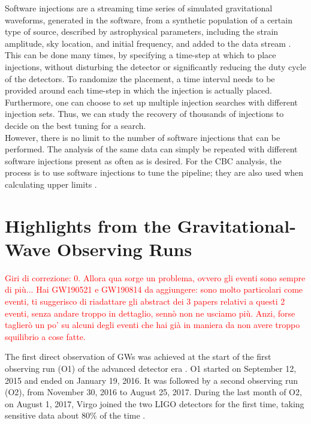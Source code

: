 \documentclass[binding=0.6cm, LaM]{sapthesis}
\newcommand{\fpg}[1]{\textcolor{red}{#1} }
\begin{document}
	Software injections are a streaming time series of simulated gravitational waveforms, 
	generated in the software, from a synthetic population of a certain type of source, 
	described by astrophysical parameters, including the strain amplitude, sky location, 	
	and initial frequency, and added to the data stream \cite{30}. 
	This can be done many times, by specifying a time-step at which to place injections, 
	without disturbing the detector or significantly reducing the duty cycle of the detectors. 
	To randomize the placement, a time interval needs to be provided around 
	each time-step in which the injection is actually placed. 
	Furthermore, one can choose to set up multiple injection searches with different injection sets. 
	Thus, we can study the recovery of thousands of injections to decide on the best tuning for a search. \\ 
	However, there is no limit to the number of software injections that can be performed. 
	The analysis of the same data can simply be repeated with different software injections present as often as is desired. 
	For the CBC analysis, the process is to use software injections to tune the pipeline; 
	they are also used when calculating upper limits \cite{47}.
	
\chapter{Highlights from the Gravitational-Wave Observing Runs}
\fpg{Giri di correzione: 0.}%
\fpg{Allora qua sorge un problema, ovvero gli eventi sono sempre di pi\`u...  Hai GW190521 e GW190814 da aggiungere: sono molto particolari come eventi, ti suggerisco di riadattare gli abstract dei 3 papers relativi a questi 2 eventi, senza andare troppo in dettaglio, senn\`o non ne usciamo pi\`u.  Anzi, forse taglier\`o un po' su alcuni degli eventi che hai gi\`a in maniera da non avere troppo squilibrio a cose fatte.}%

	The first direct observation of GWs was achieved at the start of the first observing run (O1) of the advanced detector era \cite{52}.  O1 started on September 12, 2015 and ended on January 19, 2016.  It was followed by a second observing run (O2), from November 30, 2016 to August 25, 2017.  During the last month of O2, on August 1, 2017, Virgo joined the two LIGO detectors for the first time, taking sensitive data about 80\% of the time \cite{13}.
\end{document}
